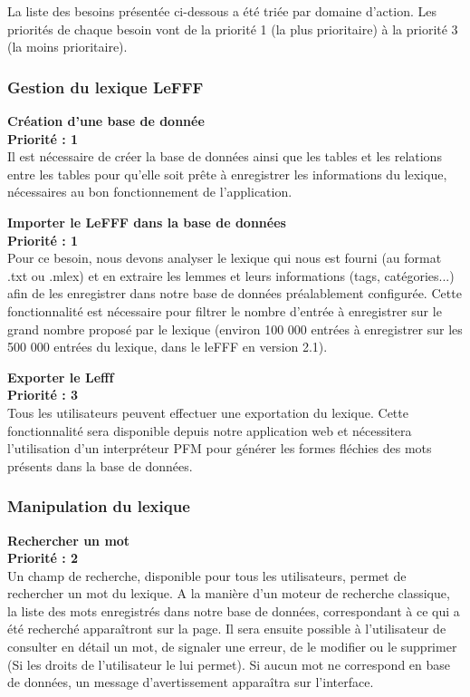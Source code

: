 \documentclass[12pt,a4paper]{article}
\begin{document}
La liste des besoins présentée ci-dessous a été triée par domaine d'action. Les priorités de chaque besoin vont de la priorité 1 (la plus prioritaire) à la priorité 3 (la moins prioritaire).

\subsubsection{Gestion du lexique LeFFF}

\textbf{Création d'une base de donnée} \\
\textbf{Priorité : 1} \\
Il est nécessaire de créer la base de données ainsi que les tables et les relations entre les tables pour qu'elle soit prête à enregistrer les informations du lexique, nécessaires au bon fonctionnement de l'application.

\textbf{Importer le LeFFF dans la base de données} \\
\textbf{Priorité : 1} \\
Pour ce besoin, nous devons analyser le lexique qui nous est fourni (au format .txt ou .mlex) et en extraire les lemmes et leurs informations (tags, catégories...) afin de les enregistrer dans notre base de données préalablement configurée.
Cette fonctionnalité est nécessaire pour filtrer le nombre d'entrée à enregistrer sur le grand nombre proposé par le lexique (environ 100 000 entrées à enregistrer sur les 500 000 entrées du lexique, dans le leFFF en version 2.1).

\textbf{Exporter le Lefff} \\
\textbf{Priorité : 3}  \\
Tous les utilisateurs peuvent effectuer une exportation du lexique. 
Cette fonctionnalité sera disponible depuis notre application web et nécessitera l'utilisation d'un interpréteur PFM pour générer les formes fléchies des mots présents dans la base de données.

\subsubsection{Manipulation du lexique} 

\textbf{Rechercher un mot} \\
\textbf{Priorité : 2} \\
Un champ de recherche, disponible pour tous les utilisateurs, permet de rechercher un mot du lexique. A la manière d'un moteur de recherche classique, la liste des mots enregistrés dans notre base de données, correspondant à ce qui a été recherché apparaîtront sur la page. Il sera ensuite possible à l'utilisateur de consulter en détail un mot, de signaler une erreur, de le modifier ou le supprimer (Si les droits de l'utilisateur le lui permet). Si aucun mot ne correspond en base de données, un message d'avertissement apparaîtra sur l'interface.
\end{document}
